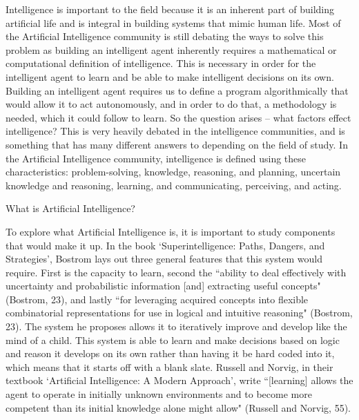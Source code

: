 \documentclass[11pt]{article}
\begin{document}
\par Intelligence is important to the field because it is an inherent part of building artificial life and is integral in building systems that mimic human life. Most of the Artificial Intelligence community is still debating the ways to solve this problem as building an intelligent agent inherently requires a mathematical or computational definition of intelligence. This is necessary in order for the intelligent agent to learn and be able to make intelligent decisions on its own. Building an intelligent agent requires us to define a program algorithmically that would allow it to act autonomously, and in order to do that, a methodology is needed, which it could follow to learn. So the question arises -- what factors effect intelligence? This is very heavily debated in the intelligence communities, and is something that has many different answers to depending on the field of study. In the Artificial Intelligence community, intelligence is defined using these characteristics: problem-solving, knowledge, reasoning, and planning, uncertain knowledge and reasoning, learning, and communicating, perceiving, and acting.

\begin{center}
	{\large What is Artificial Intelligence?\par}
\end{center}
\par To explore what Artificial Intelligence is, it is important to study components that would make it up. In the book `Superintelligence: Paths, Dangers, and Strategies', Bostrom lays out three general features that this system would require. First is the capacity to learn, second the ``ability to deal effectively with uncertainty and probabilistic information [and] extracting useful concepts" (Bostrom, 23), and lastly ``for leveraging acquired concepts into flexible combinatorial representations for use in logical and intuitive reasoning" (Bostrom, 23). The system he proposes allows it to iteratively improve and develop like the mind of a child. This system is able to learn and make decisions based on logic and reason it develops on its own rather than having it be hard coded into it, which means that it starts off with a blank slate. Russell and Norvig, in their textbook `Artificial Intelligence: A Modern Approach', write ``[learning] allows the agent to operate in initially unknown environments and to become more competent than its initial knowledge alone might allow" (Russell and Norvig, 55).
\end{document}
